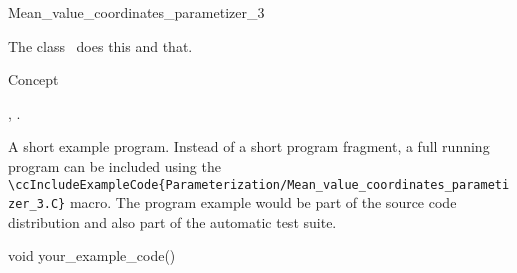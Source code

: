 

\begin{ccRefClass}{Mean_value_coordinates_parametizer_3}  %


\ccDefinition
  
The class \ccRefName\ does this and that.


\ccIsModel

Concept

\ccTypes


\ccCreation
{}  %


\ccOperations


\ccSeeAlso

,
.

\ccExample

A short example program.
Instead of a short program fragment, a full running program can be
included using the 
\verb|\ccIncludeExampleCode{Parameterization/Mean_value_coordinates_parametizer_3.C}| 
macro. The program example would be part of the source code distribution and
also part of the automatic test suite.

\begin{ccExampleCode}
void your_example_code() {
}
\end{ccExampleCode}


\end{ccRefClass}


